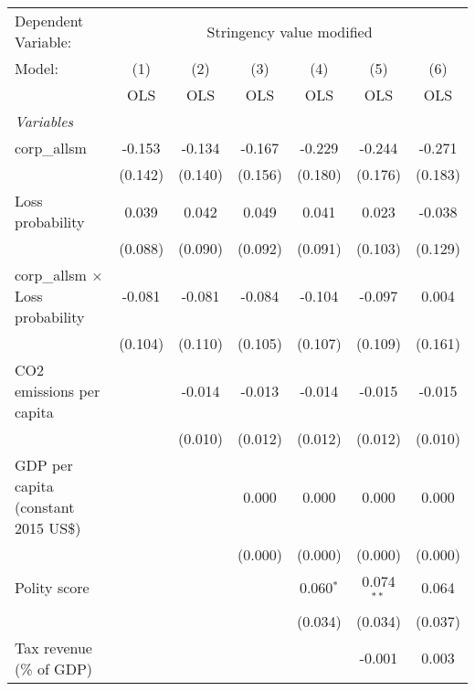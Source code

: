 
\begingroup
\centering
\begin{tabular}{lcccccc}
   \toprule
   Dependent Variable: & \multicolumn{6}{c}{Stringency value modified}\\
   Model:                                  & (1)     & (2)     & (3)     & (4)         & (5)          & (6)\\  
                                           &  OLS    & OLS     & OLS     & OLS         & OLS          & OLS\\  
   \midrule
   \emph{Variables}\\
   corp\_allsm                             & -0.153  & -0.134  & -0.167  & -0.229      & -0.244       & -0.271\\   
                                           & (0.142) & (0.140) & (0.156) & (0.180)     & (0.176)      & (0.183)\\   
   Loss probability                        & 0.039   & 0.042   & 0.049   & 0.041       & 0.023        & -0.038\\   
                                           & (0.088) & (0.090) & (0.092) & (0.091)     & (0.103)      & (0.129)\\   
   corp\_allsm $\times$ Loss probability   & -0.081  & -0.081  & -0.084  & -0.104      & -0.097       & 0.004\\   
                                           & (0.104) & (0.110) & (0.105) & (0.107)     & (0.109)      & (0.161)\\   
   CO2 emissions per capita                &         & -0.014  & -0.013  & -0.014      & -0.015       & -0.015\\   
                                           &         & (0.010) & (0.012) & (0.012)     & (0.012)      & (0.010)\\   
   GDP per capita (constant 2015 US\$)     &         &         & 0.000   & 0.000       & 0.000        & 0.000\\   
                                           &         &         & (0.000) & (0.000)     & (0.000)      & (0.000)\\   
   Polity score                            &         &         &         & 0.060$^{*}$ & 0.074$^{**}$ & 0.064\\   
                                           &         &         &         & (0.034)     & (0.034)      & (0.037)\\   
   Tax revenue (\% of GDP)                 &         &         &         &             & -0.001       & 0.003\\   

\end{tabular}

